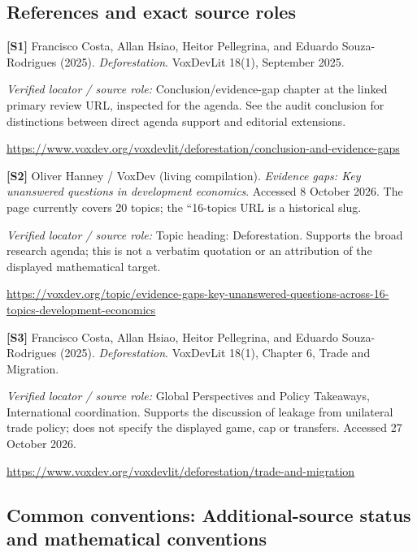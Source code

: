 \documentclass[11pt,a4paper]{article}
\begin{document}
\subsection*{References and exact source roles}

{\footnotesize\raggedright
\par\noindent\textbf{[S1]} Francisco Costa, Allan Hsiao, Heitor Pellegrina, and Eduardo Souza-Rodrigues (2025). \emph{Deforestation}. VoxDevLit 18(1), September 2025.\par \textit{Verified locator / source role:} Conclusion/evidence-gap chapter at the linked primary review URL, inspected for the agenda. See the audit conclusion for distinctions between direct agenda support and editorial extensions.\par \url{https://www.voxdev.org/voxdevlit/deforestation/conclusion-and-evidence-gaps}\par\smallskip
\par\noindent\textbf{[S2]} Oliver Hanney / VoxDev (living compilation). \emph{Evidence gaps: Key unanswered questions in development economics}. Accessed 8 October 2026. The page currently covers 20 topics; the ``16-topics URL is a historical slug.\par \textit{Verified locator / source role:} Topic heading: Deforestation. Supports the broad research agenda; this is not a verbatim quotation or an attribution of the displayed mathematical target.\par \url{https://voxdev.org/topic/evidence-gaps-key-unanswered-questions-across-16-topics-development-economics}\par\smallskip
\par\noindent\textbf{[S3]} Francisco Costa, Allan Hsiao, Heitor Pellegrina, and Eduardo Souza-Rodrigues (2025). \emph{Deforestation}. VoxDevLit 18(1), Chapter 6, Trade and Migration.\par \textit{Verified locator / source role:} Global Perspectives and Policy Takeaways, International coordination. Supports the discussion of leakage from unilateral trade policy; does not specify the displayed game, cap or transfers. Accessed 27 October 2026.\par \url{https://www.voxdev.org/voxdevlit/deforestation/trade-and-migration}\par\smallskip
}

\subsection*{Common conventions: Additional-source status and mathematical conventions}
\end{document}
